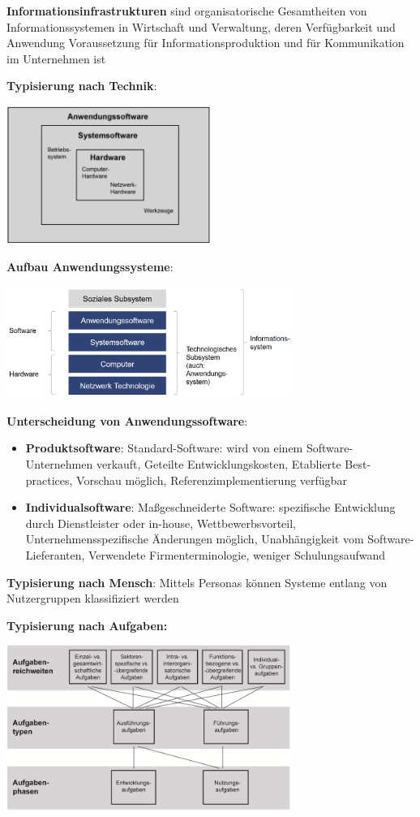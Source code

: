 \textbf{Informationsinfrastrukturen} sind organisatorische Gesamtheiten von Informationssystemen in Wirtschaft und Verwaltung, deren Verfügbarkeit und Anwendung Voraussetzung für Informationsproduktion und für Kommunikation im Unternehmen ist

\textbf{Typisierung nach Technik}:
\begin{center}
	\includegraphics[width=0.5\textwidth]{images/typisierung-technik.png}
\end{center}

\textbf{Aufbau Anwendungssysteme}:
\begin{center}
	\includegraphics[width=0.7\textwidth]{images/anwendungssysteme.png}
\end{center}

\textbf{Unterscheidung von Anwendungssoftware}:
\begin{itemize}
	\item \textbf{Produktsoftware}: Standard-Software: wird von einem Software-Unternehmen verkauft, Geteilte Entwicklungskosten, Etablierte Best-practices, Vorschau möglich, Referenzimplementierung verfügbar
	\item \textbf{Individualsoftware}: Maßgeschneiderte Software: spezifische Entwicklung durch Dienstleister oder in-house, Wettbewerbsvorteil, Unternehmensspezifische Änderungen möglich, Unabhängigkeit vom Software-Lieferanten, Verwendete Firmenterminologie, weniger Schulungsaufwand
\end{itemize}

\textbf{Typisierung nach Mensch}: Mittels Personas können Systeme entlang von Nutzergruppen klassifiziert werden

\pagebreak
\textbf{Typisierung nach Aufgaben:}
\begin{center}
	\includegraphics[width=0.7\textwidth]{images/typisierung-aufgaben.png}
\end{center}


